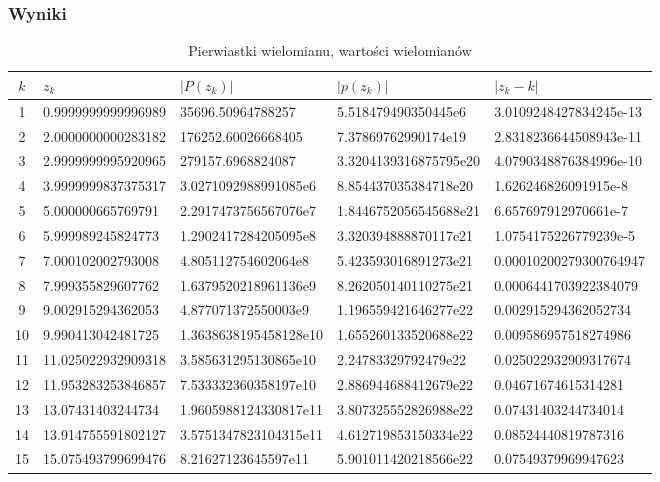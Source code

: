\documentclass[10pt,a4paper, polish]{article}
\begin{document}
\subsubsection*{Wyniki}
\begin{table}[H]
\center
\caption{Pierwiastki wielomianu, wartości wielomianów}
\begin{tabular}{|c|p{3cm}|p{3.4cm}|p{3.4cm}|p{3.5cm}|}
\hline
$k$ & $z_k$ & $|P(z_k)|$ & $|p(z_k)|$ & $|z_k - k|$ \\
\hline
1 & 0.9999999999996989 & 35696.50964788257 & 5.518479490350445e6 & 3.0109248427834245e-13 \\
\hline
2 & 2.0000000000283182 & 176252.60026668405 & 7.37869762990174e19 & 2.8318236644508943e-11 \\
\hline
3 & 2.9999999995920965 & 279157.6968824087 & 3.3204139316875795e20 & 4.0790348876384996e-10 \\
\hline
4 & 3.9999999837375317 & 3.0271092988991085e6 & 8.854437035384718e20 & 1.626246826091915e-8 \\
\hline
5 & 5.000000665769791 & 2.2917473756567076e7 & 1.8446752056545688e21 & 6.657697912970661e-7 \\
\hline
6 & 5.999989245824773 & 1.2902417284205095e8 & 3.320394888870117e21 & 1.0754175226779239e-5 \\
\hline
7 & 7.000102002793008 & 4.805112754602064e8 & 5.423593016891273e21 & 0.00010200279300764947 \\
\hline
8 & 7.999355829607762 & 1.6379520218961136e9 & 8.262050140110275e21 & 0.0006441703922384079 \\
\hline
9 & 9.002915294362053 & 4.877071372550003e9 & 1.196559421646277e22 & 0.002915294362052734 \\
\hline
10 & 9.990413042481725 & 1.3638638195458128e10 & 1.655260133520688e22 & 0.009586957518274986 \\
\hline
11 & 11.025022932909318 & 3.585631295130865e10 & 2.24783329792479e22 & 0.025022932909317674 \\
\hline
12 & 11.953283253846857 & 7.533332360358197e10 & 2.886944688412679e22 & 0.04671674615314281 \\
\hline
13 & 13.07431403244734 & 1.9605988124330817e11 & 3.807325552826988e22 & 0.07431403244734014 \\
\hline
14 & 13.914755591802127 & 3.5751347823104315e11 & 4.612719853150334e22 & 0.08524440819787316 \\
\hline
15 & 15.075493799699476 & 8.21627123645597e11 & 5.901011420218566e22 & 0.07549379969947623 \\

\end{tabular}
\end{table}
\end{document}
